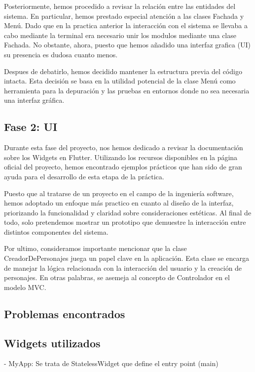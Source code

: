 \documentclass{article}
\begin{document}
Posteriormente, hemos procedido a revisar la relación entre las entidades del sistema. En particular, hemos prestado especial atención a las clases Fachada y Menú. Dado que en la practica anterior la interacción con el sistema se llevaba a cabo mediante la terminal
era necesario unir los modulos mediante una clase Fachada. No obstante, ahora, puesto que hemos añadido una interfaz grafica (UI) su presencia es dudosa cuanto menos. 

Despues de debatirlo, hemos decidido mantener la estructura previa del código intacta. Esta decisión se basa en la utilidad potencial de la clase Menú como herramienta para la depuración y las pruebas en entornos donde no sea necesaria una interfaz gráfica.


\subsection{Fase 2: UI}



Durante esta fase del proyecto, nos hemos dedicado a revisar la documentación sobre los Widgets en Flutter. Utilizando los recursos disponibles en la página oficial del proyecto, hemos encontrado ejemplos prácticos que han sido de gran ayuda para el desarrollo de esta etapa de la práctica.

Puesto que al tratarse de un proyecto en el campo de la ingeniería software, hemos adoptado un enfoque más practico en cuanto al diseño de la interfaz, priorizando la funcionalidad y claridad sobre consideraciones estéticas. Al final de todo, solo pretendemos mostrar un prototipo que demuestre la interacción entre distintos componentes del sistema.  

Por ultimo, consideramos importante mencionar que la clase CreadorDePersonajes juega un papel clave en la aplicación. Esta clase se encarga de manejar la lógica relacionada con la interacción del usuario y la creación de personajes. En otras palabras, se asemeja al concepto de Controlador en el modelo MVC. 

\subsection{Problemas encontrados}

\subsection{Widgets utilizados}
- MyApp: 
Se trata de StatelessWidget que define el entry point (main)
\end{document}
